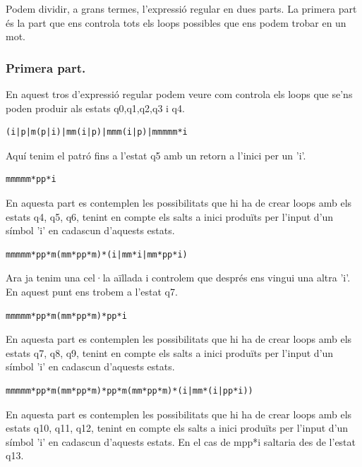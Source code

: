 \documentclass[12pt,a4paper]{report}
\begin{document}
Podem dividir, a grans termes, l'expressió regular en dues parts.
La primera part és la part que ens controla tots els loops possibles que ens podem trobar en un mot.

\subsubsection{Primera part.}

En aquest tros d'expressió regular podem veure com controla els loops que se'ns poden produir als estats q0,q1,q2,q3 i q4.

\begin{lstlisting}
(i|p|m(p|i)|mm(i|p)|mmm(i|p)|mmmmm*i
\end{lstlisting}

Aquí tenim el patró fins a l'estat q5 amb un retorn a l'inici per un 'i'.

\begin{lstlisting}
mmmmm*pp*i
\end{lstlisting}

En aquesta part es contemplen les possibilitats que  hi ha de crear loops amb els estats q4, q5, q6, tenint en compte els salts a inici produïts per l'input d'un símbol 'i' en cadascun d'aquests estats.

\begin{lstlisting}
mmmmm*pp*m(mm*pp*m)*(i|mm*i|mm*pp*i)
\end{lstlisting}

Ara ja tenim una cel·la aïllada i controlem que després ens vingui una altra 'i'. En aquest punt ens trobem a l'estat q7.

\begin{lstlisting}
mmmmm*pp*m(mm*pp*m)*pp*i
\end{lstlisting}

En aquesta part es contemplen les possibilitats que  hi ha de crear loops amb els estats q7, q8, q9, tenint en compte els salts a inici produïts per l'input d'un símbol 'i' en cadascun d'aquests estats.

\begin{lstlisting}
mmmmm*pp*m(mm*pp*m)*pp*m(mm*pp*m)*(i|mm*(i|pp*i))
\end{lstlisting}

En aquesta part es contemplen les possibilitats que  hi ha de crear loops amb els estats q10, q11, q12,  tenint en compte els salts a inici produïts per l'input d'un símbol 'i' en cadascun d'aquests estats. En el cas de mpp*i saltaria des de l'estat q13.
\end{document}
